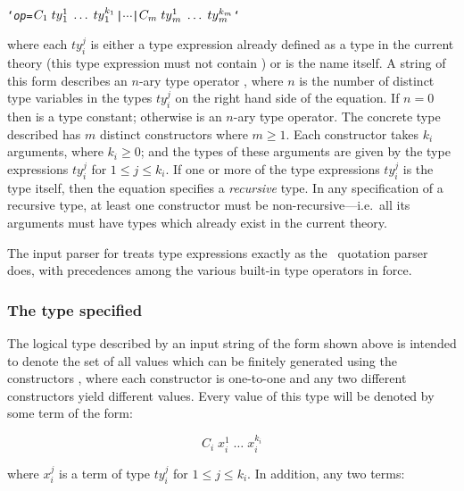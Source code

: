 {\def\op{{\normalsize\sl op}}
\begin{hol}\begin{alltt}
   `{\op} = \(C\sb{1}\;ty{}\sb{1}\sp{1}\;\ldots\;ty{}\sb{1}\sp{k\sb{1}} \) | \(\cdots\) | \(C\sb{m}\;ty{}\sb{m}\sp{1}\;\ldots\;ty{}\sb{m}\sp{k\sb{m}}\)`
\end{alltt}\end{hol}}

\noindent where each $ty_i^{j}$ is either a type expression already defined
as a type in the current theory (this type expression must not
contain ) or is the name  itself.  A string of this form
describes an $n$-ary type operator ,
where $n$ is the number of distinct type variables in the types
$ty_i^{j}$ on the right hand side of the equation.
If $n = 0$ then  is a type constant;
otherwise  is an $n$-ary type operator.  The concrete
type described has $m$
distinct constructors  where $m \geq 1$.
Each constructor  takes $k_i$ arguments, where $k_i \geq 0$;
and the types of these arguments are given by the type
expressions $ty_i^j$ for $1 \leq j \leq k_i$.  If one or more of the type
expressions $ty_i^{j}$ is the type  itself, then the \mbox{equation}
specifies a {\it recursive\/} type.  In any specification of a recursive type,
at least one constructor must be non-recursive---i.e.\ all its arguments must
have types which already exist in the current theory.

The input parser for  treats type expressions exactly as the
\HOL\ quotation parser does, with precedences among the various built-in type
operators in force.

\subsubsection{The type specified}

The logical type described by an input string of the form
shown above is intended
to denote the set of all values which can be finitely
generated using the constructors ,
where each constructor is one-to-one and any two
different constructors yield different values.   Every value of this
type will be denoted by some term of the form:

\[ C_i\;x_i^1\;\ldots\;x_i^{k_i} \]

\noindent where $x_i^j$ is a term of type $ty_i^j$ for $1 \leq j \leq
k_i$. In addition, any two terms:

